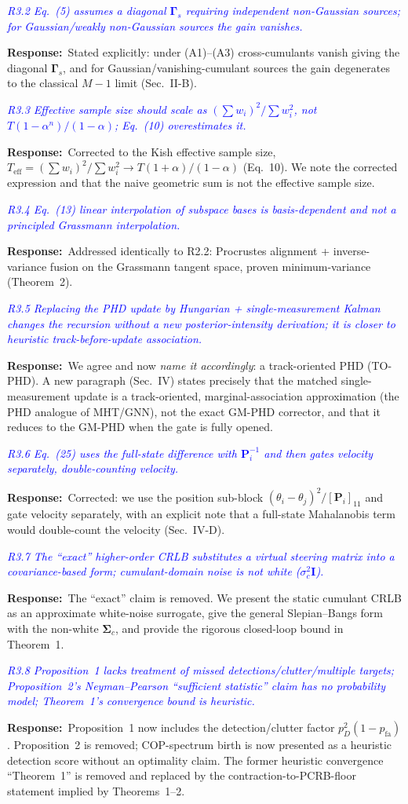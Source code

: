 \documentclass[11pt]{article}
\newcommand{\rc}[1]{\textit{\textcolor{blue}{#1}}}      %
\newcommand{\reply}{\par\noindent\textbf{Response:}\ }
\begin{document}
\rc{R3.2 Eq.~(5) assumes a diagonal $\mathbf\Gamma_s$ requiring independent
non-Gaussian sources; for Gaussian/weakly non-Gaussian sources the gain
vanishes.}
\reply Stated explicitly: under (A1)--(A3) cross-cumulants vanish giving the
diagonal $\mathbf\Gamma_s$, and for Gaussian/vanishing-cumulant sources the gain
degenerates to the classical $M-1$ limit (Sec.~II-B).

\rc{R3.3 Effective sample size should scale as $(\sum w_i)^2/\sum w_i^2$, not
$T(1-\alpha^n)/(1-\alpha)$; Eq.~(10) overestimates it.}
\reply Corrected to the Kish effective sample size,
$T_{\mathrm{eff}}=(\sum w_i)^2/\sum w_i^2 \to T(1+\alpha)/(1-\alpha)$ (Eq.~10).
We note the corrected expression and that the naive geometric sum is not the
effective sample size.

\rc{R3.4 Eq.~(13) linear interpolation of subspace bases is basis-dependent and
not a principled Grassmann interpolation.}
\reply Addressed identically to R2.2: Procrustes alignment + inverse-variance
fusion on the Grassmann tangent space, proven minimum-variance (Theorem~2).

\rc{R3.5 Replacing the PHD update by Hungarian + single-measurement Kalman
changes the recursion without a new posterior-intensity derivation; it is closer
to heuristic track-before-update association.}
\reply We agree and now \emph{name it accordingly}: a track-oriented PHD
(TO-PHD). A new paragraph (Sec.~IV) states precisely that the matched
single-measurement update is a track-oriented, marginal-association
approximation (the PHD analogue of MHT/GNN), not the exact GM-PHD corrector, and
that it reduces to the GM-PHD when the gate is fully opened.

\rc{R3.6 Eq.~(25) uses the full-state difference with $\mathbf P_i^{-1}$ and then
gates velocity separately, double-counting velocity.}
\reply Corrected: we use the position sub-block $(\theta_i-\theta_j)^2/
[\mathbf P_i]_{11}$ and gate velocity separately, with an explicit note that a
full-state Mahalanobis term would double-count the velocity (Sec.~IV-D).

\rc{R3.7 The ``exact'' higher-order CRLB substitutes a virtual steering matrix
into a covariance-based form; cumulant-domain noise is not white
($\sigma_c^2\mathbf I$).}
\reply The ``exact'' claim is removed. We present the static cumulant CRLB as an
approximate white-noise surrogate, give the general Slepian--Bangs form with the
non-white $\mathbf\Sigma_c$, and provide the rigorous closed-loop bound in
Theorem~1.

\rc{R3.8 Proposition~1 lacks treatment of missed detections/clutter/multiple
targets; Proposition~2's Neyman--Pearson ``sufficient statistic'' claim has no
probability model; Theorem~1's convergence bound is heuristic.}
\reply Proposition~1 now includes the detection/clutter factor
$p_D^2(1-p_{\mathrm{fa}})$. Proposition~2 is removed; COP-spectrum birth is now
presented as a heuristic detection score without an optimality claim. The former
heuristic convergence ``Theorem~1'' is removed and replaced by the
contraction-to-PCRB-floor statement implied by Theorems~1--2.
\end{document}
